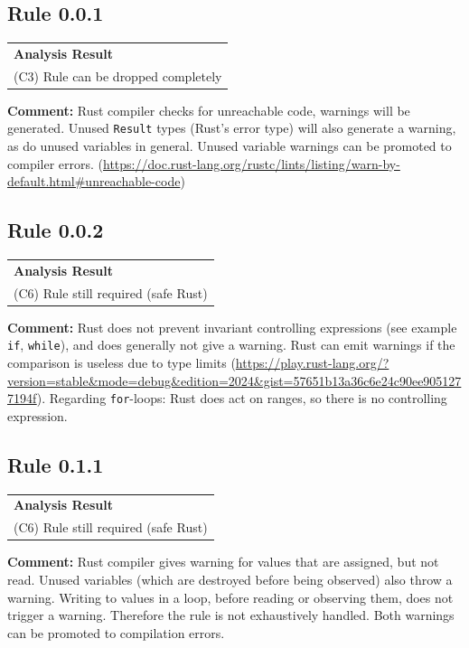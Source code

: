 \subsection*{Rule 0.0.1}
\begin{longtable}{p{13cm}}
\textbf{Analysis Result} \\
(C3) Rule can be dropped completely \\
\end{longtable}
\textbf{Comment:} Rust compiler checks for unreachable code, warnings will be generated. Unused \texttt{Result} types (Rust's error type) will also generate a warning, as do unused variables in general. Unused variable warnings can be promoted to compiler errors. (\url{https://doc.rust-lang.org/rustc/lints/listing/warn-by-default.html#unreachable-code}) \\


\subsection*{Rule 0.0.2}
\begin{longtable}{p{13cm}}
\textbf{Analysis Result} \\
(C6) Rule still required (safe Rust) \\
\end{longtable}
\textbf{Comment:} Rust does not prevent invariant controlling expressions (see example \texttt{if}, \texttt{while}), and does generally not give a warning. Rust can emit warnings if the comparison is useless due to type limits (\url{https://play.rust-lang.org/?version=stable&mode=debug&edition=2024&gist=57651b13a36c6e24c90ee9051277194f}). Regarding \texttt{for}-loops: Rust does act on ranges, so there is no controlling expression. \\


\subsection*{Rule 0.1.1}
\begin{longtable}{p{13cm}}
\textbf{Analysis Result} \\
(C6) Rule still required (safe Rust) \\
\end{longtable}
\textbf{Comment:} Rust compiler gives warning for values that are assigned, but not read. Unused variables (which are destroyed before being observed) also throw a warning. Writing to values in a loop, before reading or observing them, does not trigger a warning. Therefore the rule is not exhaustively handled. Both warnings can be promoted to compilation errors. \\


